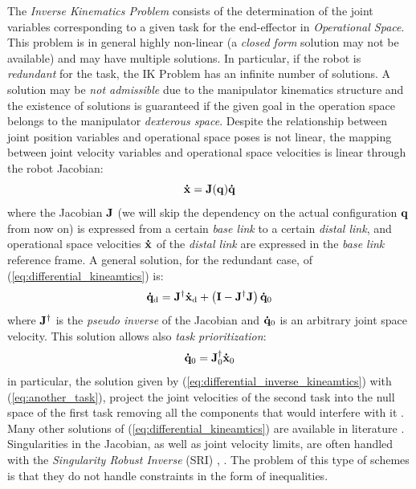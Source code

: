 The \emph{Inverse Kinematics Problem} consists of the determination of the joint variables corresponding to a given task for the end-effector in \emph{Operational Space}. This problem is in general highly non-linear (a \emph{closed form} solution may not be available) and may have multiple solutions. In particular, if the robot is \emph{redundant} for the task, the IK Problem has an infinite number of solutions. A solution may be \emph{not admissible} due to the manipulator kinematics structure and the existence of solutions is guaranteed if the given goal in the operation space belongs to the manipulator \emph{dexterous space}.
Despite the relationship between joint position variables and operational space poses is not linear, the mapping between joint velocity variables and operational space velocities is linear through the robot Jacobian:
\begin{equation}
    \label{eq:differential_kineamtics}
    \mathbf{\dot{x}} = \mathbf{J}(\mathbf{q})\mathbf{\dot{q}}
\end{equation}
where the Jacobian $\mathbf{J}$ (we will skip the dependency on the actual configuration $\mathbf{q}$ from now on) is expressed from a certain \emph{base link} to a certain \emph{distal link}, and operational space velocities $\mathbf{\dot{x}}$ of the \emph{distal link} are expressed in the \emph{base link} reference frame.
A general solution, for the redundant case, of (\ref{eq:differential_kineamtics}) is:
\begin{equation}
    \label{eq:differential_inverse_kineamtics}
    \mathbf{\dot{q}}_\text{d} = \mathbf{J}^{\dagger}\mathbf{\dot{x}}_\text{d} + \left( \mathbf{I} - \mathbf{J}^{\dagger}\mathbf{J} \right)\mathbf{\dot{q}}_\text{0}
\end{equation}
where $\mathbf{J}^{\dagger}$ is the \emph{pseudo inverse} of the Jacobian and $\mathbf{\dot{q}}_\text{0}$ is an arbitrary joint space velocity. 
This solution allows also \emph{task prioritization}: 
\begin{equation}
    \label{eq:another_task}
\mathbf{\dot{q}}_\text{0} = \mathbf{J}_\text{0}^{\dagger}\mathbf{\dot{x}}_\text{0}
\end{equation}
in particular, the solution given by (\ref{eq:differential_inverse_kineamtics}) with (\ref{eq:another_task}), project the joint velocities of the second task into the null space of the first task removing all the components that would interfere with it \cite{DBLPReferenceRobo2008}. Many other solutions of (\ref{eq:differential_kineamtics}) are available in literature \cite{siciliano1991general}. Singularities in the Jacobian, as well as joint velocity limits, are often handled with the \emph{Singularity Robust Inverse} (SRI) \cite{nakamura1990-tp}, \cite{MaciejewskiK89}.
The problem of this type of schemes is that they do not handle constraints in the form of inequalities. 

